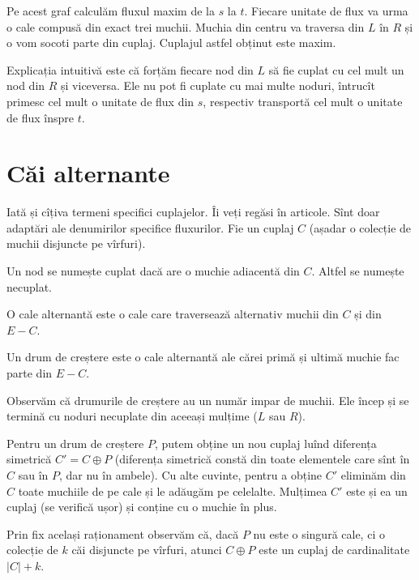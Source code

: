 \documentclass[../main.tex]{subfiles}
\begin{document}
Pe acest graf calculăm fluxul maxim de la $s$ la $t$. Fiecare unitate de flux va urma o cale compusă din exact trei muchii. Muchia din centru va traversa din $L$ în $R$ și o vom socoti parte din cuplaj. Cuplajul astfel obținut este maxim.

Explicația intuitivă este că forțăm fiecare nod din $L$ să fie cuplat cu cel mult un nod din $R$ și viceversa. Ele nu pot fi cuplate cu mai multe noduri, întrucît primesc cel mult o unitate de flux din $s$, respectiv transportă cel mult o unitate de flux înspre $t$.

\section{Căi alternante}

Iată și cîțiva termeni specifici cuplajelor. Îi veți regăsi în articole. Sînt doar adaptări ale denumirilor specifice fluxurilor. Fie un cuplaj $C$ (așadar o colecție de muchii disjuncte pe vîrfuri).

\begin{definition}
  Un nod se numește cuplat dacă are o muchie adiacentă din $C$. Altfel se numește necuplat.
\end{definition}

\begin{definition}
  O cale alternantă este o cale care traversează alternativ muchii din $C$ și din $E - C$.
\end{definition}

\begin{definition}
  Un drum de creștere este o cale alternantă ale cărei primă și ultimă muchie fac parte din $E - C$.
\end{definition}

Observăm că drumurile de creștere au un număr impar de muchii. Ele încep și se termină cu noduri necuplate din aceeași mulțime ($L$ sau $R$).

Pentru un drum de creștere $P$, putem obține un nou cuplaj luînd diferența simetrică $C' = C \oplus P$ (diferența simetrică constă din toate elementele care sînt în $C$ sau în $P$, dar nu în ambele). Cu alte cuvinte, pentru a obține $C'$ eliminăm din $C$ toate muchiile de pe cale și le adăugăm pe celelalte. Mulțimea $C'$ este și ea un cuplaj (se verifică ușor) și conține cu o muchie în plus.

Prin fix același raționament observăm că, dacă $P$ nu este o singură cale, ci o colecție de $k$ căi disjuncte pe vîrfuri, atunci $C \oplus P$ este un cuplaj de cardinalitate $|C| + k$.
\end{document}
